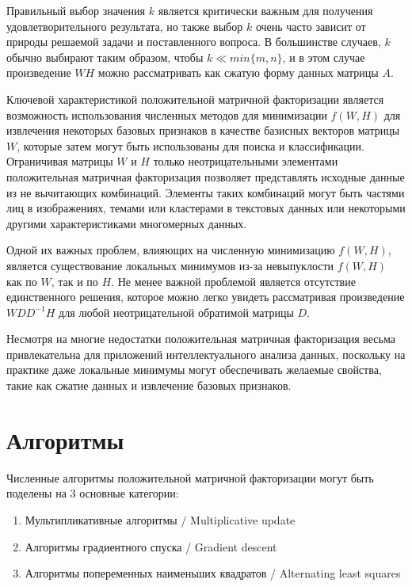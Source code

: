 \documentclass[14pt]{extarticle}
\begin{document}
Правильный выбор значения $k$ является критически важным для получения удовлетворительного результата, но также выбор $k$ очень часто зависит от природы решаемой задачи и поставленного вопроса. В большинстве случаев, $k$ обычно выбирают таким образом, чтобы $k \ll min\{m, n\}$, и в этом случае произведение $WH$ можно рассматривать как сжатую форму данных матрицы $A$. 

Ключевой характеристикой положительной матричной факторизации является возможность использования численных методов для минимизации $f(W,H)​$ для извлечения некоторых базовых признаков в качестве базисных векторов матрицы $W​$, которые затем могут быть использованы для поиска и классификации. Ограничивая матрицы $W​$ и $H​$ только неотрицательными элементами положительная матричная факторизация позволяет представлять исходные данные из не вычитающих комбинаций. Элементы таких комбинаций могут быть частями лиц в изображениях, темами или кластерами в текстовых данных или некоторыми другими характеристиками многомерных данных.

Одной их важных проблем, влияющих на численную минимизацию $f(W, H)$, является существование локальных минимумов из-за невыпуклости $f(W, H)$ как по $W$, так и по $H$. Не менее важной проблемой является отсутствие единственного решения, которое можно легко увидеть рассматривая произведение $WDD^{− 1}H$ для любой неотрицательной обратимой матрицы $D$. 

Несмотря на многие недостатки положительная матричная факторизация весьма привлекательна для приложений интеллектуального анализа данных, поскольку на практике даже локальные минимумы могут обеспечивать желаемые свойства, такие как сжатие данных и извлечение базовых признаков. 


\newpage


\section{Алгоритмы}

Численные алгоритмы положительной матричной факторизации могут быть поделены на 3 основные категории:
\begin{enumerate}
	\item Мультипликативные алгоритмы / Multiplicative update
	\item Алгоритмы градиентного спуска / Gradient descent
	\item Алгоритмы попеременных наименьших квадратов / Alternating least squares
\end{enumerate}
\end{document}
